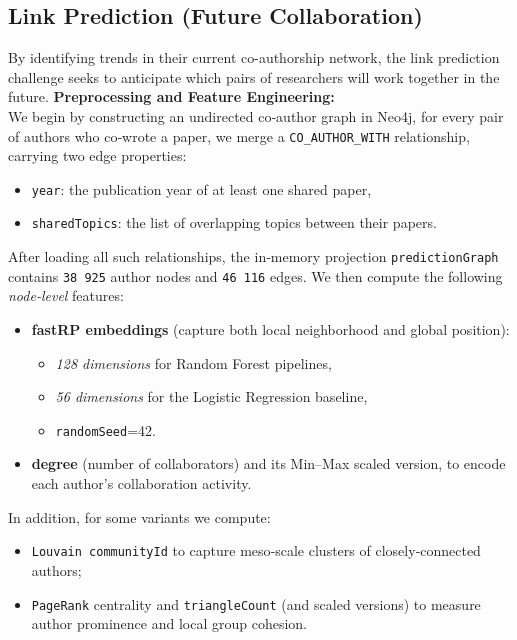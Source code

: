 \documentclass[conference]{IEEEtran}
\begin{document}
\subsection{Link Prediction (Future Collaboration)}
\noindent By identifying trends in their current co-authorship network, the link prediction challenge seeks to anticipate which pairs of researchers will work together in the future.
\newline \newline
\noindent\textbf{Preprocessing and Feature Engineering:}\\
We begin by constructing an undirected co‐author graph in Neo4j, for every pair of authors who co‐wrote a paper, we merge a \texttt{CO\_AUTHOR\_WITH} relationship, carrying two edge properties:
    \begin{itemize}
      \item \texttt{year}: the publication year of at least one shared paper,  
      \item \texttt{sharedTopics}: the list of overlapping topics between their papers.
    \end{itemize}
After loading all such relationships, the in‐memory projection \texttt{predictionGraph} contains \texttt{38\,925} author nodes and \texttt{46\,116} edges. We then compute the following \emph{node‐level} features:
    \begin{itemize}
      \item \textbf{fastRP embeddings} (capture both local neighborhood and global position):
        \begin{itemize}
          \item \emph{128 dimensions} for Random Forest pipelines,  
          \item \emph{56 dimensions} for the Logistic Regression baseline,  
          \item \texttt{randomSeed}=42.
        \end{itemize}
      \item \textbf{degree} (number of collaborators) and its Min–Max scaled version, to encode each author’s collaboration activity.
    \end{itemize}
In addition, for some variants we compute:
    \begin{itemize}
      \item \texttt{Louvain communityId} to capture meso‐scale clusters of closely‐connected authors;  
      \item \texttt{PageRank} centrality and \texttt{triangleCount} (and scaled versions) to measure author prominence and local group cohesion.
    \end{itemize}
\end{document}
